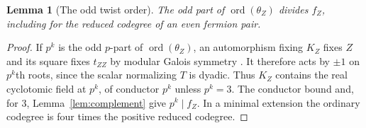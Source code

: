 \documentclass[11pt,a4paper]{article}
\numberwithin{equation}{section}
\newtheorem{lemma}[theorem]{Lemma}
\theoremstyle{remark}
\DeclareMathOperator{\ord}{ord}
\begin{document}
\begin{lemma}[The odd twist order]\label{thm:twistdiv}
The odd part of $\ord(\theta_Z)$ divides $f_Z$, including for the reduced codegree of an even fermion pair.
\end{lemma}
\begin{proof}
If $p^k$ is the odd $p$-part of $\ord(\theta_Z)$, an automorphism fixing $K_Z$ fixes $Z$ and its square fixes $t_{ZZ}$ by modular Galois symmetry \cite[Theorem~II]{DLNCongruence}.
It therefore acts by $\pm1$ on $p^k$th roots, since the scalar normalizing $T$ is dyadic.
Thus $K_Z$ contains the real cyclotomic field at $p^k$, of conductor $p^k$ unless $p^k=3$.
The conductor bound and, for $3$, Lemma~\ref{lem:complement} give $p^k\mid f_Z$.
In a minimal extension the ordinary codegree is four times the positive reduced codegree.
\end{proof}
\end{document}
